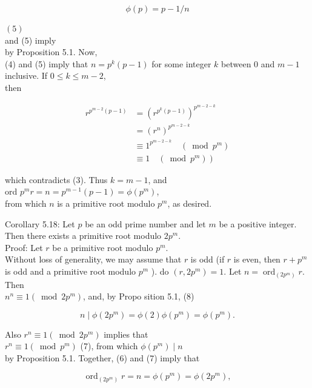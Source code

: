 \documentclass[10pt]{article}
\begin{document}
$$
\phi(p)=p-1 / n
$$

$(5)$\\
and (5) imply\\
by Proposition 5.1. Now,\\
(4) and (5) imply that $n=p^{k}(p-1)$ for some integer $k$ between 0 and $m-1$ inclusive. If $0 \leqslant k \leqslant m-2$,\\
then

$$
\begin{aligned}
r^{p^{m-2}(p-1)} & =\left(r^{p^{k}(p-1)}\right)^{p^{m-2-k}} \\
& =\left(r^{n}\right)^{p^{m-2-k}} \\
& \equiv 1^{p^{m-2-k}} \quad\left(\bmod p^{m}\right) \\
& \left.\equiv 1 \quad\left(\bmod p^{m}\right)\right)
\end{aligned}
$$

which contradicts (3). Thus $k=m-1$, and\\
ord $p^{m} r=n=p^{m-1}(p-1)=\phi\left(p^{m}\right)$,\\
from which $n$ is a primitive root modulo $p^{m}$, as desired.

Corollary 5.18: Let $p$ be an odd prime number and let $m$ be a positive integer. Then there exists a primitive root modulo $2 p^{m}$.\\
Proof: Let $r$ be a primitive root modulo $p^{m}$.\\
Without loss of generality, we may assume that $r$ is odd (if $r$ is even, then $r+p^{m}$ is odd and a primitive root modulo $p^{m}$ ). do $\left(r, 2 p^{m}\right)=1$. Let $n=\operatorname{ord}_{\left(2 p^{m}\right)} r$. Then\\
$n^{n} \equiv 1\left(\bmod 2 p^{m}\right)$, and, by Propo sition 5.1, (8)


\begin{equation*}
n \mid \phi\left(2 p^{m}\right)=\phi(2) \phi\left(p^{m}\right)=\phi\left(p^{m}\right) . \tag{6}
\end{equation*}


Also $r^{n} \equiv 1\left(\bmod 2 p^{m}\right)$ implies that\\
$r^{n} \equiv 1\left(\bmod p^{m}\right)$ (7), from which $\phi\left(p^{m}\right) \mid n$\\
by Proposition 5.1. Together, (6) and (7) imply that

$$
\operatorname{ord}_{\left(2 p^{m}\right)} r=n=\phi\left(p^{m}\right)=\phi\left(2 p^{m}\right),
$$
\end{document}
